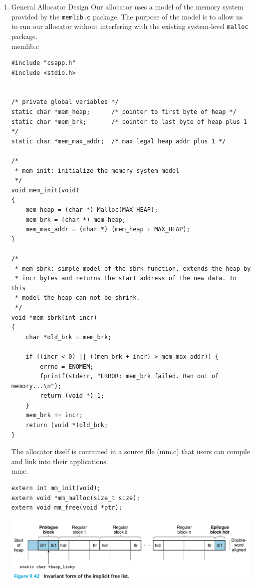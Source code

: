\documentclass[11pt]{article}
\begin{document}
\begin{enumerate}
\item General Allocator Design
\label{sec:org0c0c2e7}
Our allocator uses a model of the memory system provided by the \texttt{memlib.c} package. The purpose of the model is to allow us to run our allocator without interfering with the existing system-level \texttt{malloc} package.\\

memlib.c\\
\begin{verbatim}
#include "csapp.h"
#include <stdio.h>


/* private global variables */
static char *mem_heap;		/* pointer to first byte of heap */
static char *mem_brk;		/* pointer to last byte of heap plus 1 */
static char *mem_max_addr;	/* max legal heap addr plus 1 */

/* 
 * mem_init: initialize the memory system model
 */
void mem_init(void)
{
    mem_heap = (char *) Malloc(MAX_HEAP);
    mem_brk = (char *) mem_heap;
    mem_max_addr = (char *) (mem_heap + MAX_HEAP);
}

/* 
 * mem_sbrk: simple model of the sbrk function. extends the heap by
 * incr bytes and returns the start address of the new data. In this
 * model the heap can not be shrink.
 */
void *mem_sbrk(int incr)
{
    char *old_brk = mem_brk;

    if ((incr < 0) || ((mem_brk + incr) > mem_max_addr)) {
        errno = ENOMEM;
        fprintf(stderr, "ERROR: mem_brk failed. Ran out of memory...\n");
        return (void *)-1;
    }
    mem_brk += incr;
    return (void *)old_brk;
}

\end{verbatim}


The allocator itself is contained in a source file (mm.c) that users can compile and link into their applications.\\
mmc.\\
\begin{verbatim}
extern int mm_init(void);
extern void *mm_malloc(size_t size);
extern void mm_free(void *ptr);
\end{verbatim}

\begin{center}
\includegraphics[width=.9\linewidth]{pics/figure9.41-invariant-form-of-implicit-free-list.png}
\end{center}


\end{enumerate}
\end{document}
